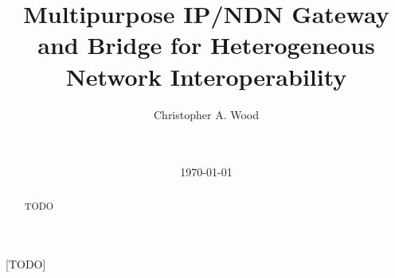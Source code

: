\documentclass{sigcomm}
\begin{document}
\title{Multipurpose IP/NDN Gateway and Bridge for Heterogeneous Network Interoperability}

\author{
\alignauthor
Christopher A. Wood\\
       \\
       \\
}

\date{\today}

\maketitle
\begin{abstract}
TODO
\end{abstract}

[TODO]







% 
% 
% 




\end{document}
